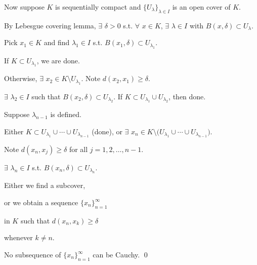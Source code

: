 \documentclass[10pt,aspectratio=169]{beamer}
\begin{document}
\begin{frame}

Now suppose $K$ is sequentially compact and
$\{ U_\lambda \}_{\lambda \in I}$ is an open cover of $K$.

\pause
By Lebesgue covering lemma, $\exists$ $\delta > 0$
s.t. $\forall$ $x \in K$, $\exists$ $\lambda \in I$ with
$B(x,\delta) \subset U_\lambda$.

\pause
\medskip

Pick $x_1 \in K$ and find $\lambda_1 \in I$ s.t. $B(x_1,\delta) \subset U_{\lambda_1}$.

\pause
\medskip

If $K \subset U_{\lambda_1}$, we are done.

\pause
Otherwise, $\exists$ $x_2 \in K \setminus U_{\lambda_1}$.
\pause
\qquad
Note $d(x_2,x_1) \geq \delta$.

\pause
$\exists$ $\lambda_2 \in I$ such that $B(x_2,\delta) \subset U_{\lambda_2}$.
\pause
\qquad
If $K \subset U_{\lambda_1} \cup U_{\lambda_2}$, then done.

\pause
\medskip

Suppose $\lambda_{n-1}$ is defined.

\pause
Either
$K \subset U_{\lambda_1} \cup
\cdots \cup
U_{\lambda_{n-1}}$
(done),
\pause
or
$\exists$ $x_n \in
K \setminus \bigl( U_{\lambda_1} \cup
\cdots \cup U_{\lambda_{n-1}}\bigr)$.

\pause
Note $d(x_n,x_j) \geq \delta$ for all $j = 1,2,\ldots,n-1$.

\pause
$\exists$
$\lambda_n \in I$ s.t. $B(x_n,\delta) \subset U_{\lambda_n}$.

\pause
\vspace*{-0.3in}
\hspace*{2in}



\vspace*{-0.8in}

\pause
Either we find a subcover,

\pause
or we obtain a sequence
$\{ x_n \}_{n=1}^\infty$

in $K$ such that 
$d(x_n,x_k) \geq \delta$

whenever $k \not= n$.

\pause
\medskip

No subsequence of $\{ x_n \}_{n=1}^\infty$ can be
Cauchy.
\pause
\quad \contradiction
\qed

\end{frame}
\end{document}
